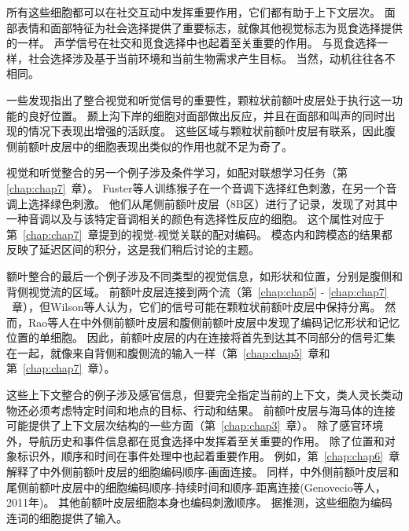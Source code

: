 所有这些细胞都可以在社交互动中发挥重要作用，它们都有助于上下文层次。
面部表情和面部特征为社会选择提供了重要标志，就像其他视觉标志为觅食选择提供的一样。
声学信号在社交和觅食选择中也起着至关重要的作用。
与觅食选择一样，社会选择涉及基于当前环境和当前生物需求产生目标。
当然，动机往往各不相同。
\par


一些发现指出了整合视觉和听觉信号的重要性，颗粒状前额叶皮层处于执行这一功能的良好位置。
颞上沟下岸的细胞对面部做出反应，并且在面部和叫声的同时出现的情况下表现出增强的活跃度\cite{barraclough2005integration}。
这些区域与颗粒状前额叶皮层有联系，因此腹侧前额叶皮层中的细胞表现出类似的作用也就不足为奇了\cite{sugihara2006integration}。
\par


视觉和听觉整合的另一个例子涉及条件学习，如配对联想学习任务（第~ \ref{chap:chap7}~章）。
Fuster等人\cite{fuster2000executive}训练猴子在一个音调下选择红色刺激，在另一个音调上选择绿色刺激。
他们从尾侧前额叶皮层（8B区）进行了记录，发现了对其中一种音调以及与该特定音调相关的颜色有选择性反应的细胞。
这个属性对应于第~\ref{chap:chap7}~章提到的视觉-视觉关联的配对编码。
模态内和跨模态的结果都反映了延迟区间的积分，这是我们稍后讨论的主题。
\par


额叶整合的最后一个例子涉及不同类型的视觉信息，如形状和位置，分别是腹侧和背侧视觉流的区域。
前额叶皮层连接到两个流（第~\ref{chap:chap5} - \ref{chap:chap7} ~章），但Wilson等人\cite{wilson1993dissociation}认为，它们的信号可能在颗粒状前额叶皮层中保持分离。
然而，Rao等人\cite{rao1997integration}在中外侧前额叶皮层和腹侧前额叶皮层中发现了编码记忆形状和记忆位置的单细胞。
因此，前额叶皮层的内在连接将首先到达其不同部分的信号汇集在一起，就像来自背侧和腹侧流的输入一样（第~\ref{chap:chap5}~章和第~\ref{chap:chap7}~章）。
\par

这些上下文整合的例子涉及感官信息，但要完全指定当前的上下文，类人灵长类动物还必须考虑特定时间和地点的目标、行动和结果。
前额叶皮层与海马体的连接可能提供了上下文层次结构的一些方面（第~\ref{chap:chap3}~章）。
除了感官环境外，导航历史和事件信息都在觅食选择中发挥着至关重要的作用。
除了位置和对象标识外，顺序和时间在事件处理中也起着重要作用。
例如，第~\ref{chap:chap6}~章解释了中外侧前额叶皮层的细胞编码顺序-画面连接\cite{warden2007representation}。
同样，中外侧前额叶皮层和尾侧前额叶皮层中的细胞编码顺序-持续时间\cite{tsujimoto2009monkey}和顺序-距离连接(Genovecio等人，2011年)。
其他前额叶皮层细胞本身也编码刺激顺序\cite{ninokura2003representation,ninokura2004integration}。
据推测，这些细胞为编码连词的细胞提供了输入。
\par


